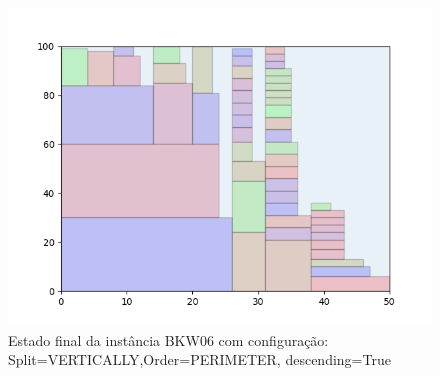 \begin{figure}[H]
    \centering
    \caption[]{Estado final da instância BKW06 com configuração: Split=VERTICALLY,Order=PERIMETER, descending=True}
    \label{fig:bkw06-vertically-perimeter-true}
    \includegraphics[scale=0.5]{output/figures/bkw/bkw06/vertically/perimeter/true/00}
\end{figure}
